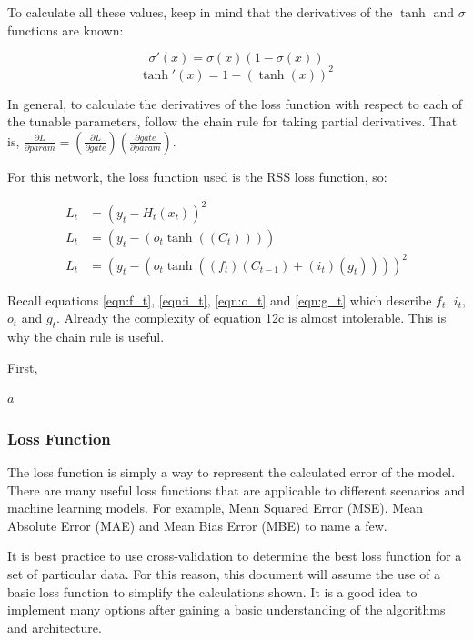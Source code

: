 \documentclass[12pt]{article}
\begin{document}
To calculate all these values, keep in mind that the derivatives of the $\tanh$
and $\sigma$ functions are known:

\begin{equation}
    \sigma'(x) = \sigma(x)(1-\sigma(x))
\end{equation}
\begin{equation}
    \tanh'(x) = 1 - (\tanh(x))^2
\end{equation}

In general, to calculate the derivatives of the loss function with respect to
each of the tunable parameters, follow the chain rule for taking partial
derivatives. That is, $\frac{\partial L}{\partial param} = (\frac{\partial L}{\partial gate}) (\frac{\partial gate}{\partial param})$.

For this network, the loss function used is the RSS loss function, so:

\begin{subequations}
    \begin{align}
        L_t & = (y_t - H_t(x_t))^2                                 \\
        L_t & = (y_t - (o_t\tanh((C_t))))                          \\
        L_t & = (y_t - (o_t \tanh((f_t)(C_{t-1}) + (i_t)(g_t))))^2
    \end{align}
\end{subequations}

Recall equations \ref{eqn:f_t}, \ref{eqn:i_t}, \ref{eqn:o_t} and \ref{eqn:g_t}
which describe $f_t$, $i_t$, $o_t$ and $g_t$. Already the complexity of
equation 12c is almost intolerable. This is why the chain rule is useful.

First,

\begin{math}
    a
\end{math}

\subsubsection{Loss Function}

The loss function is simply a way to represent the calculated error of the
model. There are many useful loss functions that are applicable to different
scenarios and machine learning models. For example, Mean Squared Error (MSE),
Mean Absolute Error (MAE) and Mean Bias Error (MBE) to name a few.

It is best practice to use cross-validation to determine the best loss function
for a set of particular data. For this reason, this document will assume the
use of a basic loss function to simplify the calculations shown. It is a good
idea to implement many options after gaining a basic understanding of the
algorithms and architecture.
\end{document}
